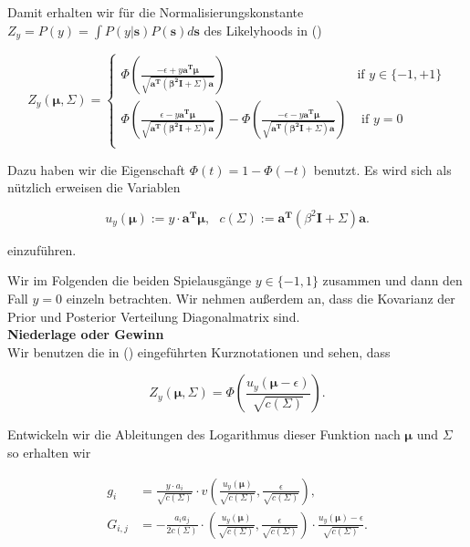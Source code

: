 \documentclass[12pt,a4paper]{scrartcl}
\numberwithin{equation}{section}
\begin{document}
Damit erhalten wir für die Normalisierungskonstante $Z_y = P(y) = \int P(y| \mathbf{s}) P(\mathbf{s}) d \mathbf{s}$ des Likelyhoods in ()

\begin{equation}
 Z_y(\mathbf{\mu, \varSigma}) = \begin{cases}
                                 \Phi( \frac{- \epsilon + y \mathbf{a^T \mu}}{\sqrt{\mathbf{a^T (\beta^2 I + \varSigma) a}}} ) & \mbox{if } y \in \{ -1, +1 \} \\
                                 \Phi( \frac{ \epsilon - y \mathbf{a^T \mu}}{\sqrt{\mathbf{a^T (\beta^2 I + \varSigma) a}}} ) - \Phi( \frac{- \epsilon - y \mathbf{a^T \mu}}{\sqrt{\mathbf{a^T (\beta^2 I + \varSigma) a}}}) & \mbox{ if } y = 0 \\
                                \end{cases}
\end{equation}

Dazu haben wir die Eigenschaft $\Phi(t) = 1 - \Phi(-t)$ benutzt. Es wird sich als nützlich erweisen die Variablen 

\begin{equation}
 u_y(\mathbf{\mu}) := y \cdot \mathbf{a^T \mu}, \text{		} c(\mathbf{\varSigma}) := \mathbf{a^T} (\beta^2 \mathbf{I} + \mathbf{\varSigma}) \mathbf{a}.
\end{equation}

einzuführen. 

Wir im Folgenden die beiden Spielausgänge $y \in \{ -1,1 \}$ zusammen und dann den Fall $y = 0$ einzeln betrachten. Wir nehmen außerdem an, dass die Kovarianz der Prior und Posterior Verteilung
Diagonalmatrix sind.  \\

\textbf{Niederlage oder Gewinn } \\
Wir benutzen die in () eingeführten Kurznotationen und sehen, dass 

\begin{equation}
 Z_y(\mathbf{\mu, \varSigma}) = \Phi \left( \frac{u_y(\mathbf{\mu}- \epsilon)}{\sqrt{c (\mathbf{\varSigma})}} \right ).
\end{equation}

Entwickeln wir die Ableitungen des Logarithmus dieser Funktion nach $\mathbf{\mu}$ und $\mathbf{\varSigma}$ so erhalten wir 

\begin{equation}
 \begin{split}
  g_i &= \frac{y \cdot a_i}{\sqrt{c(\mathbf{\varSigma})}} \cdot v \left ( \frac{u_y(\mathbf{\mu})}{\sqrt{c(\mathbf{\varSigma})}}, \frac{\epsilon}{\sqrt{c(\mathbf{\varSigma})}}  \right )  , \\
  G_{i,j} &= - \frac{a_i a_j}{2 c(\varSigma)} \cdot \left ( \frac{u_y(\mathbf{\mu})}{\sqrt{c(\mathbf{\varSigma})}}, \frac{\epsilon}{\sqrt{c(\mathbf{\varSigma})}}  \right ) \cdot \frac{u_y(\mathbf{\mu}) - \epsilon}{\sqrt{c(\mathbf{\varSigma})}}.
 \end{split}
\end{equation}
\end{document}

